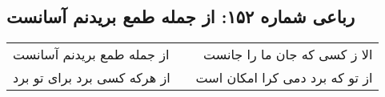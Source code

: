 \begin{center}
\section*{رباعی شماره ۱۵۲: از جمله طمع بریدنم آسانست}
\label{sec:0152}
\begin{longtable}{l p{0.5cm} r}
از جمله طمع بریدنم آسانست
&&
الا ز کسی که جان ما را جانست
\\
از هرکه کسی برد برای تو برد
&&
از تو که برد دمی کرا امکان است
\\
\end{longtable}
\end{center}
